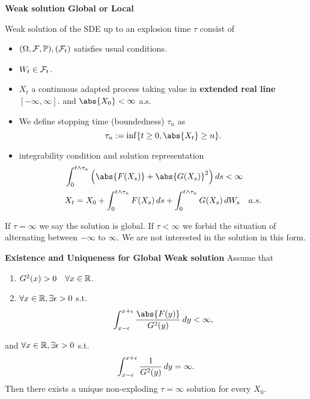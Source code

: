 \noindent \textbf{Weak solution Global or Local}
\begin{dfn}
Weak solution of the SDE up to an explosion time $\tau$ consist of
\begin{itemize}
    \item $(\Omega, \mathcal{F}, \mathbb{P}), (\mathcal{F}_t)$ satisfies usual conditions.
    \item $W_t \in \mathcal{F}_t$.
    \item $X_t$ a continuous adapted process taking value in \textbf{extended real line $[-\infty, \infty]$}. and $\abs{X_0} < \infty$ a.s.
    \item We define stopping time (boundedness) $\tau_n$ as 
    \begin{equation*}
        \tau_n := \inf\{t\geq0, \abs{X_t} \geq n\}.
    \end{equation*}
    \item integrability condition and solution representation
    \begin{align*}
        &\int_0^{t \wedge \tau_n} \left(\abs{F(X_s)} + \abs{G(X_s)}^2 \right)\diff s <\infty \\
        &X_t = X_0 + \int_0^{t \wedge \tau_n} F(X_s) \diff s + \int_0^{t \wedge \tau_n} G(X_s) \diff W_s \quad a.s.
    \end{align*}
\end{itemize}
\end{dfn}
If $\tau = \infty$ we say the solution is global. If $\tau <\infty$ we forbid the situation of alternating between $-\infty$ to $\infty$. We are not interested in the solution in this form.

\textbf{Existence and Uniqueness for Global Weak solution}
Assume that 
\begin{enumerate}
    \item $G^2(x) > 0 \quad \forall x\in \mathbb{R}$.
    \item $\forall x \in \mathbb{R}, \exists \epsilon >0$ s.t. \begin{equation*}
        \int_{x-\epsilon}^{x+\epsilon} \frac{\abs{F(y)}}{G^2(y)} \diff y < \infty,  
    \end{equation*}
\end{enumerate}
and $\forall x \in \mathbb{R}, \exists \epsilon >0$ s.t.
\begin{equation*}
    \int_{x-\epsilon}^{x+\epsilon} \frac{1}{G^2(y)} \mathop{}\!d y = \infty.
\end{equation*}
Then there exists a unique non-exploding $\tau = \infty$ solution for every $X_0$.

